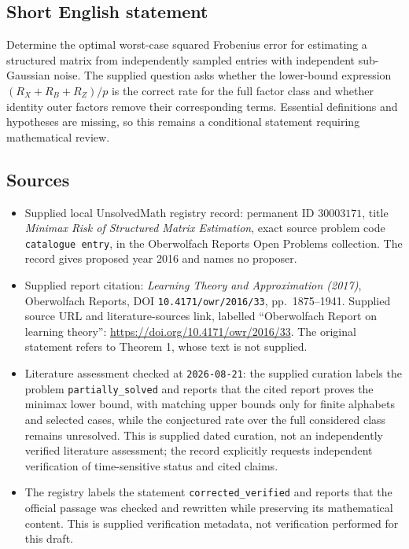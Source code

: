 \documentclass[11pt]{article}
\begin{document}
\subsection{Short English statement}
Determine the optimal worst-case squared Frobenius error for estimating a structured matrix from independently sampled entries with independent sub-Gaussian noise. The supplied question asks whether the lower-bound expression \((R_X+R_B+R_Z)/p\) is the correct rate for the full factor class and whether identity outer factors remove their corresponding terms. Essential definitions and hypotheses are missing, so this remains a conditional statement requiring mathematical review.
\subsection{Sources}
\begin{itemize}
\item Supplied local UnsolvedMath registry record: permanent ID \(30003171\), title \emph{Minimax Risk of Structured Matrix Estimation}, exact source problem code \texttt{catalogue entry}, in the Oberwolfach Reports Open Problems collection. The record gives proposed year 2016 and names no proposer.
\item Supplied report citation: \emph{Learning Theory and Approximation (2017)}, Oberwolfach Reports, DOI \texttt{10.4171/owr/2016/33}, pp.\ 1875--1941. Supplied source URL and literature-sources link, labelled ``Oberwolfach Report on learning theory'': \url{https://doi.org/10.4171/owr/2016/33}. The original statement refers to Theorem 1, whose text is not supplied.
\item Literature assessment checked at \texttt{2026-08-21}: the supplied curation labels the problem \texttt{partially\_solved} and reports that the cited report proves the minimax lower bound, with matching upper bounds only for finite alphabets and selected cases, while the conjectured rate over the full considered class remains unresolved. This is supplied dated curation, not an independently verified literature assessment; the record explicitly requests independent verification of time-sensitive status and cited claims.
\item The registry labels the statement \texttt{corrected\_verified} and reports that the official passage was checked and rewritten while preserving its mathematical content. This is supplied verification metadata, not verification performed for this draft.
\end{itemize}
\end{document}
